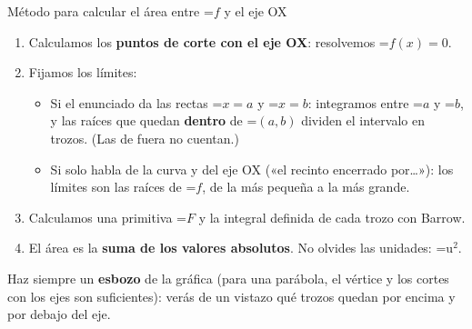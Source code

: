 \documentclass[11pt,a4paper]{article}
\newcommand{\fmm}[1]{\setbox0=\hbox{$#1$}\ifdim\wd0>\linewidth\[#1\]\else\mbox{\box0}\fi}
\begin{document}
  
\begin{fmprop}{Método para calcular el área entre \fmm{f} y el eje OX}
\begin{enumerate}
\item Calculamos los \textbf{puntos de corte con el eje OX}: resolvemos \fmm{f(x)=0}.
\item Fijamos los límites:
          
\begin{itemize}
\item Si el enunciado da las rectas \fmm{x=a} y \fmm{x=b}: integramos entre \fmm{a} y \fmm{b}, y las raíces que quedan \textbf{dentro} de \fmm{(a,b)} dividen el intervalo en trozos. (Las de fuera no cuentan.)
\item Si solo habla de la curva y del eje OX («el recinto encerrado por\dots{}»): los límites son las raíces de \fmm{f}, de la más pequeña a la más grande.
\end{itemize}
\item Calculamos una primitiva \fmm{F} y la integral definida de cada trozo con Barrow.
\item El área es la \textbf{suma de los valores absolutos}. No olvides las unidades: \fmm{\text{u}^2}.
\end{enumerate}

      
\begin{fmnote}Haz siempre un \textbf{esbozo} de la gráfica (para una parábola, el vértice y los cortes con los ejes son suficientes): verás de un vistazo qué trozos quedan por encima y por debajo del eje.\end{fmnote}
\end{fmprop}
\end{document}
